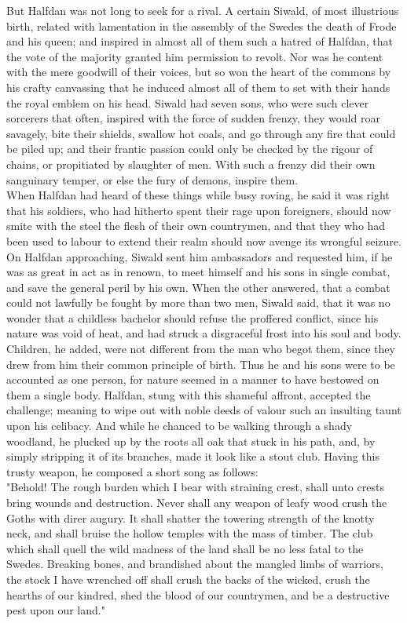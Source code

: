 \documentclass[10pt,a4paper]{report}
\begin{document}
But Halfdan was not long to seek for a rival. A certain Siwald, of most illustrious birth, related with lamentation in the assembly of the Swedes the death of Frode and his queen; and inspired in almost all of them such a hatred of Halfdan, that the vote of the majority granted him permission to revolt. Nor was he content with the mere goodwill of their voices, but so won the heart of the commons by his crafty canvassing that he induced almost all of them to set with their hands the royal emblem on his head. Siwald had seven sons, who were such clever sorcerers that often, inspired with the force of sudden frenzy, they would roar savagely, bite their shields, swallow hot coals, and go through any fire that could be piled up; and their frantic passion could only be checked by the rigour of chains, or propitiated by slaughter of men. With such a frenzy did their own sanguinary temper, or else the fury of demons, inspire them.\\

When Halfdan had heard of these things while busy roving, he said it was right that his soldiers, who had hitherto spent their rage upon foreigners, should now smite with the steel the flesh of their own countrymen, and that they who had been used to labour to extend their realm should now avenge its wrongful seizure. On Halfdan approaching, Siwald sent him ambassadors and requested him, if he was as great in act as in renown, to meet himself and his sons in single combat, and save the general peril by his own. When the other answered, that a combat could not lawfully be fought by more than two men, Siwald said, that it was no wonder that a childless bachelor should refuse the proffered conflict, since his nature was void of heat, and had struck a disgraceful frost into his soul and body. Children, he added, were not different from the man who begot them, since they drew from him their common principle of birth. Thus he and his sons were to be accounted as one person, for nature seemed in a manner to have bestowed on them a single body. Halfdan, stung with this shameful affront, accepted the challenge; meaning to wipe out with noble deeds of valour such an insulting taunt upon his celibacy. And while he chanced to be walking through a shady woodland, he plucked up by the roots all oak that stuck in his path, and, by simply stripping it of its branches, made it look like a stout club. Having this trusty weapon, he composed a short song as follows:\\

"Behold! The rough burden which I bear with straining crest, shall unto crests bring wounds and destruction. Never shall any weapon of leafy wood crush the Goths with direr augury. It shall shatter the towering strength of the knotty neck, and shall bruise the hollow temples with the mass of timber. The club which shall quell the wild madness of the land shall be no less fatal to the Swedes. Breaking bones, and brandished about the mangled limbs of warriors, the stock I have wrenched off shall crush the backs of the wicked, crush the hearths of our kindred, shed the blood of our countrymen, and be a destructive pest upon our land."\\
\end{document}
